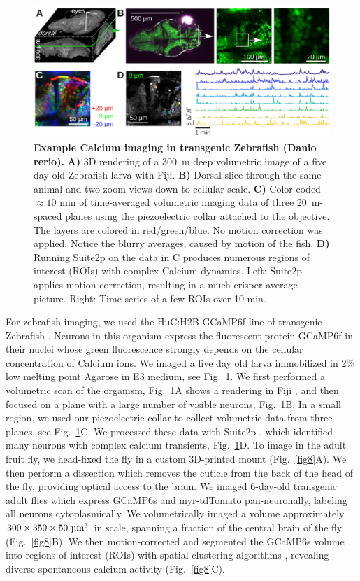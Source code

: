 \documentclass[10pt,letterpaper]{article}
\begin{document}
\begin{figure}[t]
    \includegraphics[width=\textwidth]{fig7.jpg}
    \caption{{\bf Example Calcium imaging in transgenic Zebrafish (Danio rerio).} \textbf{A)} 3D rendering of a 300~\textmu m deep volumetric image of a five day old Zebrafish larva with Fiji\cite{Schindelin2019}. \textbf{B)} Dorsal slice through the same animal and two zoom views down to cellular scale. \textbf{C)} Color-coded $\approx10\text{ min}$ of time-averaged volumetric imaging data of three 20~\textmu m-spaced planes using the piezoelectric collar attached to the objective. The layers are colored in red/green/blue. No motion correction was applied. Notice the blurry averages, caused by motion of the fish. \textbf{D)} Running Suite2p on the data in C produces numerous regions of interest (ROIs) with complex Calcium dynamics. Left: Suite2p applies motion correction, resulting in a much crisper average picture. Right: Time series of a few ROIs over 10 min.}
    \label{fig7}
\end{figure}
%
%
For zebrafish imaging, we used the HuC:H2B-GCaMP6f line of transgenic Zebrafish \cite{Cong2017}. Neurons in this organism express the fluorescent protein GCaMP6f in their nuclei whose green fluorescence strongly depends on the cellular concentration of Calcium ions. We imaged a five day old larva immobilized in 2\% low melting point Agarose in E3 medium, see Fig.~\ref{fig7}. We first performed a volumetric scan of the organism, Fig.~\ref{fig7}A shows a rendering in Fiji \cite{Schindelin2019}, and then focused on a plane with a large number of visible neurons, Fig.~\ref{fig7}B. In a small region, we used our piezoelectric collar to collect volumetric data from three planes, see Fig.~\ref{fig7}C. We processed these data with Suite2p \cite{Pachitariu2016}, which identified many neurons with complex calcium transients, Fig.~\ref{fig7}D.\newline
To image in the adult fruit fly, we head-fixed the fly in a custom 3D-printed mount \cite{Pacheco2021} (Fig.~\ref{fig8}A). We then perform a dissection which removes the cuticle from the back of the head of the fly, providing optical access to the brain. We imaged 6-day-old transgenic adult flies which express GCaMP6s and myr-tdTomato pan-neuronally, labeling all neurons cytoplasmically. We volumetrically imaged a volume approximately $300\times350\times50 \text{ \textmu m}^3$ in scale, spanning a fraction of the central brain of the fly (Fig.~\ref{fig8}B). We then motion-corrected and segmented the GCaMP6s volume into regions of interest (ROIs) with spatial clustering algorithms \cite{Pacheco2021}, revealing diverse spontaneous calcium activity (Fig.~\ref{fig8}C). 
\end{document}
